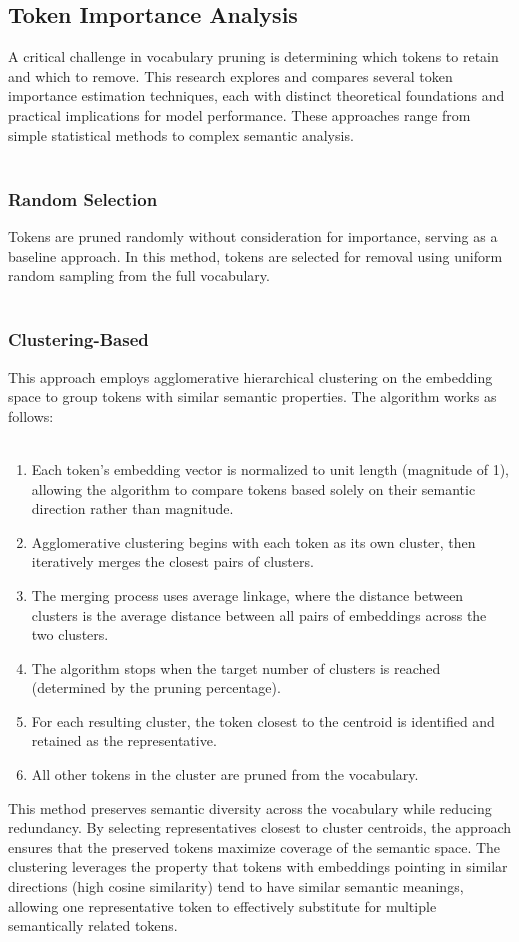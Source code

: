\documentclass[twocolumn]{article}
\begin{document}
\subsection{Token Importance Analysis}
A critical challenge in vocabulary pruning is determining which tokens to retain and which to remove. This research explores and compares several token importance estimation techniques, each with distinct theoretical foundations and practical implications for model performance. These approaches range from simple statistical methods to complex semantic analysis.
\\ \\
\subsubsection{Random Selection}
Tokens are pruned randomly without consideration for importance, serving as a baseline approach. In this method, tokens are selected for removal using uniform random sampling from the full vocabulary.
\\ \\
\subsubsection{Clustering-Based}
This approach employs agglomerative hierarchical clustering on the embedding space to group tokens with similar semantic properties. The algorithm works as follows:
\\ \\
\begin{enumerate}
    \item Each token's embedding vector is normalized to unit length (magnitude of 1), allowing the algorithm to compare tokens based solely on their semantic direction rather than magnitude.
    \item Agglomerative clustering begins with each token as its own cluster, then iteratively merges the closest pairs of clusters.
    \item The merging process uses average linkage, where the distance between clusters is the average distance between all pairs of embeddings across the two clusters.
    \item The algorithm stops when the target number of clusters is reached (determined by the pruning percentage).
    \item For each resulting cluster, the token closest to the centroid is identified and retained as the representative.
    \item All other tokens in the cluster are pruned from the vocabulary.
\end{enumerate}
This method preserves semantic diversity across the vocabulary while reducing redundancy. By selecting representatives closest to cluster centroids, the approach ensures that the preserved tokens maximize coverage of the semantic space. The clustering leverages the property that tokens with embeddings pointing in similar directions (high cosine similarity) tend to have similar semantic meanings, allowing one representative token to effectively substitute for multiple semantically related tokens.
\\ \\
\end{document}
